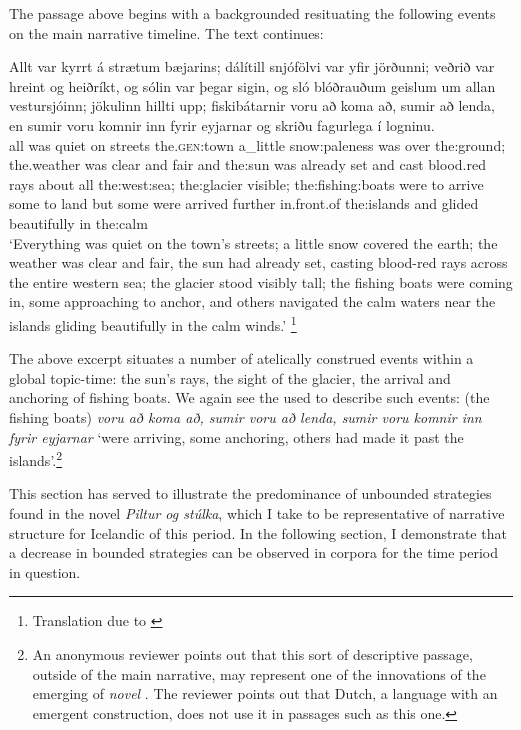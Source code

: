 \documentclass[output=paper,colorlinks,citecolor=brown]{langscibook}
\begin{document}
The passage above begins with a backgrounded  resituating the following events on the main narrative timeline. The text continues:

\ea\label{ex:ps3}
\gll Allt var kyrrt á strætum bæjarins; dálítill snjófölvi var yfir jörðunni; veðrið var hreint og heiðríkt, og sólin var þegar sigin, og sló blóðrauðum geislum um allan vestursjóinn; jökulinn {hillti upp;} fiskibátarnir voru að koma að, sumir að lenda, en sumir voru komnir inn fyrir eyjarnar og skriðu fagurlega í logninu. \\
all was quiet on streets the.\textsc{gen}:town a\_little snow:paleness was over the:ground; the.weather was clear and fair and the:sun was already set and cast blood.red rays about all the:west:sea; the:glacier visible; the:fishing:boats were to arrive {} some to land but some were arrived further in.front.of the:islands and glided beautifully in the:calm\\
\glt `Everything was quiet on the town's streets; a little snow covered the earth; the weather was clear and fair, the sun had already set, casting blood-red rays across the entire western sea; the glacier stood visibly tall; the fishing boats were coming in, some approaching to anchor, and others navigated the calm waters near the islands gliding beautifully in the calm winds.' \hfill \citep{Thoroddsen_PilturOgStulka}\footnote{Translation due to \citet[166]{thoroddsen1890lad}}
\z

The above excerpt situates a number of atelically construed events within a global topic-time: the sun's rays, the sight of the glacier, the arrival and anchoring of fishing boats. We again see the   used to describe such events: (the fishing boats) \textit{voru að koma að, sumir voru að lenda, sumir voru komnir inn fyrir eyjarnar} `were arriving, some anchoring, others had made it past the islands'.\footnote{An anonymous reviewer points out that this sort of descriptive passage, outside of the main narrative, may represent one of the innovations of the emerging  of \textit{novel} \citep{Fludernik2003}. The reviewer points out that Dutch, a language with an emergent   construction, does not use it in passages such as this one.}

This section has served to illustrate the predominance of unbounded strategies found in the novel \textit{Piltur og stúlka}, which I take to be representative of narrative structure for Icelandic of this period. In the following section, I demonstrate that a decrease in bounded strategies can be observed in corpora for the time period in question.
\end{document}
